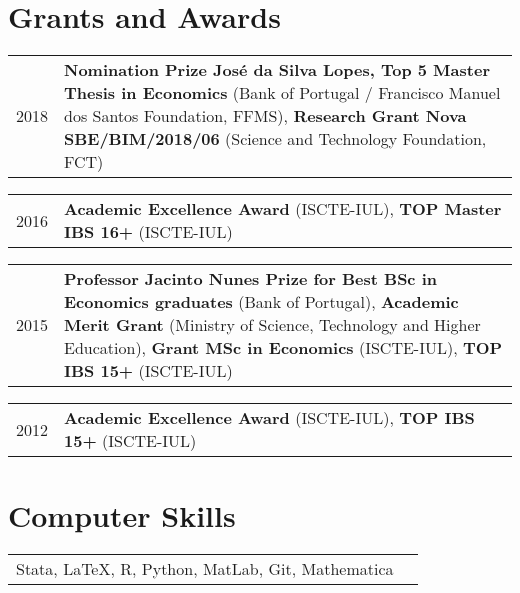 \documentclass[a4paper,11pt]{article} %
\begin{document}
\section[Grants and Awards]{\faEuro \hspace{3pt} Grants and Awards}

\begin{tabular}{r|p{13cm}}
	2018 & \textbf{Nomination Prize José da Silva Lopes, Top 5 Master Thesis in Economics} (Bank of Portugal / Francisco Manuel dos Santos Foundation, FFMS), \textbf{Research Grant Nova SBE/BIM/2018/06} (Science and Technology Foundation, FCT) \\
\end{tabular}

\begin{tabular}{r|p{13cm}}
	2016 & \textbf{Academic Excellence Award} (ISCTE-IUL), \textbf{TOP Master IBS 16+} (ISCTE-IUL) \\
\end{tabular}

\begin{tabular}{r|p{13cm}}
	2015 & \textbf{Professor Jacinto Nunes Prize for Best BSc in Economics graduates} (Bank of Portugal), \textbf{Academic Merit Grant} (Ministry of Science, Technology and Higher Education), \textbf{Grant MSc in Economics} (ISCTE-IUL), \textbf{TOP IBS 15+} (ISCTE-IUL) \\
\end{tabular}

\begin{tabular}{r|p{13cm}}
	2012 & \textbf{Academic Excellence Award} (ISCTE-IUL), \textbf{TOP IBS 15+} 	(ISCTE-IUL) \\
\end{tabular}
%



\section[Computer Skills]{\faKeyboardO \hspace{3pt} Computer Skills}

\begin{tabular}{rl}
	Stata, {\fb \LaTeX}, \textsc{R}, Python, MatLab, Git, Mathematica
\end{tabular}
\end{document}

